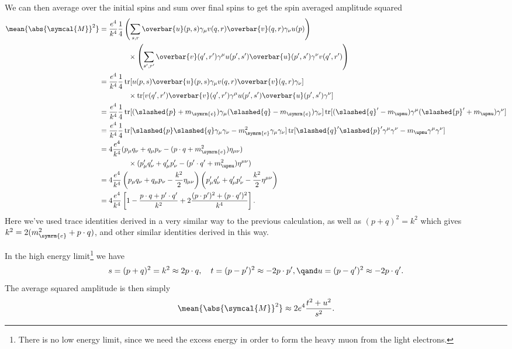 \documentclass[fleqn]{NotesClass}
\newcommand{\minkowskiMetric}{\eta}
\newcommand{\amplitude}{\symcal{M}}
\DeclareMathOperator{\tr}{tr}
\newcommand{\diracadjoint}[1]{\overbar{#1}}
\begin{document}
    We can then average over the initial spins and sum over final spins to get the spin averaged amplitude squared
    \begin{align}
        \mean{\abs{\amplitude}^2} &= \frac{e^4}{k^4} \frac{1}{4} \left( \sum_{s, r} \diracadjoint{u}(p, s) \gamma_\mu v(q, r) \diracadjoint{v}(q, r) \gamma_\nu u(p) \right) \notag\\
        &\qquad\qquad \times \left( \sum_{s', r'} \diracadjoint{v}(q', r') \gamma^\mu u(p', s') \diracadjoint{u}(p', s') \gamma^\nu v(q', r') \right)\\
        &= \frac{e^4}{k^4} \frac{1}{4} \tr[u(p, s)\diracadjoint{u}(p, s) \gamma_\mu v(q, r)\diracadjoint{v}(q, r) \gamma_\nu] \notag\\
        &\qquad\qquad \times \tr[v(q', r')\diracadjoint{v}(q', r') \gamma^\mu u(p', s')\diracadjoint{u}(p', s') \gamma^\nu]\\
        &= \frac{e^4}{k^4} \frac{1}{4} \tr[(\slashed{p} + m_{\symrm{e}})\gamma_\mu(\slashed{q} - m_{\symrm{e}})\gamma_\nu] \tr[(\slashed{q}' - m_{\upmu})\gamma^\mu(\slashed{p}' + m_{\upmu})\gamma^\nu]\\
        &= \frac{e^4}{k^4} \frac{1}{4} \tr[\slashed{p}\slashed{q}\gamma_\mu\gamma_\nu - m_{\symrm{e}}^2\gamma_\mu\gamma_\nu] \tr[\slashed{q}'\slashed{p}'\gamma^\mu\gamma^\nu - m_{\upmu}\gamma^\mu\gamma^\nu]\\
        &= 4\frac{e^4}{k^4} (p_\mu q_\nu + q_\mu p_\nu - (p \cdot q + m_{\symrm{e}}^2) \minkowskiMetric_{\mu\nu}) \notag\\
        &\qquad\qquad \times (p'_\mu q'_\nu + q'_\mu p'_\nu - (p' \cdot q' + m_{\upmu}^2)\minkowskiMetric^{\mu\nu})\\
        &= 4\frac{e^4}{k^4} \left( p_\mu q_\nu + q_\mu p_\nu - \frac{k^2}{2} \minkowskiMetric_{\mu\nu} \right) \left( p'_\mu q'_\nu + q'_\mu p'_\nu - \frac{k^2}{2}\minkowskiMetric^{\mu\nu} \right)\\
        &= 4\frac{e^4}{k^4} \left[ 1 - \frac{p \cdot q + p' \cdot q'}{k^2} + 2 \frac{(p \cdot p')^2 + (p \cdot q')^2}{k^4} \right].
    \end{align}
    Here we've used trace identities derived in a very similar way to the previous calculation, as well as \((p + q)^2 = k^2\) which gives \(k^2 = 2(m_{\symrm{e}}^2 + p \cdot q)\), and other similar identities derived in this way.
    
    In the high energy limit\footnote{There is no low energy limit, since we need the excess energy in order to form the heavy muon from the light electrons.} we have
    \begin{equation*}
        s = (p + q)^2 = k^2 \approx 2p \cdot q, \quad t = (p - p')^2 \approx -2p \cdot p', \qand u = (p - q')^2 \approx -2p\cdot q'.
    \end{equation*}
    The average squared amplitude is then simply
    \begin{equation}
        \mean{\abs{\amplitude}^2} \approx 2e^4\frac{t^2 + u^2}{s^2}.
    \end{equation}
    
\end{document}
